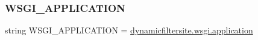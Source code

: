 \subsubsection{\texorpdfstring{W\+S\+G\+I\+\_\+\+A\+P\+P\+L\+I\+C\+A\+T\+I\+ON}{WSGI\_APPLICATION}}
{\footnotesize\ttfamily string W\+S\+G\+I\+\_\+\+A\+P\+P\+L\+I\+C\+A\+T\+I\+ON = \textquotesingle{}\mbox{\hyperlink{namespacedynamicfiltersite_1_1wsgi_a9556574144704032c9e6bafa10276622}{dynamicfiltersite.\+wsgi.\+application}}\textquotesingle{}}

